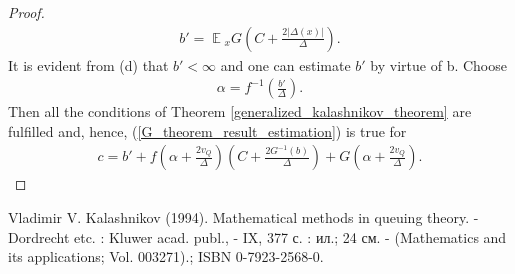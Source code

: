 \documentclass[10pt, reqno]{amsart}
\theoremstyle{definition}
\newcommand{\aasVar}{Q} %
\newcommand{\gtfVar}{G} %
\newcommand{\gdfVar}{f} %
\newcommand{\absolute}[1]{\left|#1\right|}
\DeclareMathOperator*{\E}{\mathbb{E}}
\begin{document}
\begin{proof}
\begin{gather}
		b' = \E{}_{x}\gtfVar\left(C + \frac{2\absolute{\Delta(x)}}{\Delta}\right).
		\label{G_theorem_b'_constant}
		\end{gather}
		It is evident from (d) that $b' < \infty$ and one can estimate $b'$ by virtue of b. Choose
		\begin{gather}
		\alpha = \gdfVar^{-1}\left(\frac{b'}{\Delta}\right).
		\label{G_theorem_alpha_constant}
		\end{gather}
		Then all the conditions of Theorem \ref{generalized_kalashnikov_theorem} are fulfilled and, hence, (\ref{G_theorem_result_estimation}) is true for
		\begin{gather}
		c = b' + \gdfVar\left(\alpha + \frac{2v_{\aasVar}}{\Delta}\right)\left(C + \frac{2\gtfVar^{-1}(b)}{\Delta}\right) + \gtfVar\left(\alpha + \frac{2v_{\aasVar}}{\Delta}\right).
		\label{G_theorem_c_constant}
		\end{gather}
	\end{proof}
	
	\begin{thebibliography}{1}
		\bigskip
		\footnotesize
		Vladimir V. Kalashnikov (1994). Mathematical methods in queuing theory. - Dordrecht etc. : Kluwer acad. publ., - IX, 377 с. : ил.; 24 см. - (Mathematics and its applications; Vol. 003271).; ISBN 0-7923-2568-0.
		
	\end{thebibliography}
\end{document}
